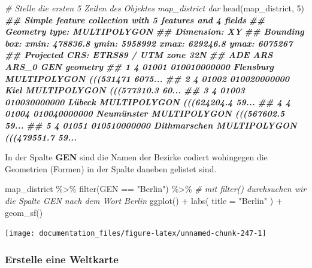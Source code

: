 \documentclass[
]{article}
\newenvironment{Shaded}{\begin{snugshade}}{\end{snugshade}}
\newcommand{\AttributeTok}[1]{\textcolor[rgb]{0.77,0.63,0.00}{#1}}
\newcommand{\CommentTok}[1]{\textcolor[rgb]{0.56,0.35,0.01}{\textit{#1}}}
\newcommand{\DecValTok}[1]{\textcolor[rgb]{0.00,0.00,0.81}{#1}}
\newcommand{\DocumentationTok}[1]{\textcolor[rgb]{0.56,0.35,0.01}{\textbf{\textit{#1}}}}
\newcommand{\FunctionTok}[1]{\textcolor[rgb]{0.00,0.00,0.00}{#1}}
\newcommand{\NormalTok}[1]{#1}
\newcommand{\SpecialCharTok}[1]{\textcolor[rgb]{0.00,0.00,0.00}{#1}}
\newcommand{\StringTok}[1]{\textcolor[rgb]{0.31,0.60,0.02}{#1}}
\begin{document}
\begin{Shaded}
\begin{Highlighting}[]

\CommentTok{\# Stelle die ersten 5 Zeilen des Objektes map\_district dar}
\FunctionTok{head}\NormalTok{(map\_district, }\DecValTok{5}\NormalTok{)}
\DocumentationTok{\#\# Simple feature collection with 5 features and 4 fields}
\DocumentationTok{\#\# Geometry type: MULTIPOLYGON}
\DocumentationTok{\#\# Dimension:     XY}
\DocumentationTok{\#\# Bounding box:  xmin: 478836.8 ymin: 5958992 xmax: 629246.8 ymax: 6075267}
\DocumentationTok{\#\# Projected CRS: ETRS89 / UTM zone 32N}
\DocumentationTok{\#\#   ADE   ARS        ARS\_0          GEN                       geometry}
\DocumentationTok{\#\# 1   4 01001 010010000000    Flensburg MULTIPOLYGON (((531471 6075...}
\DocumentationTok{\#\# 2   4 01002 010020000000         Kiel MULTIPOLYGON (((577310.3 60...}
\DocumentationTok{\#\# 3   4 01003 010030000000       Lübeck MULTIPOLYGON (((624204.4 59...}
\DocumentationTok{\#\# 4   4 01004 010040000000   Neumünster MULTIPOLYGON (((567602.5 59...}
\DocumentationTok{\#\# 5   4 01051 010510000000 Dithmarschen MULTIPOLYGON (((479551.7 59...}
\end{Highlighting}
\end{Shaded}

In der Spalte \textbf{GEN} sind die Namen der Bezirke codiert wohingegen die Geometrien (Formen) in der Spalte daneben gelistet sind.

\begin{Shaded}
\begin{Highlighting}[]

\NormalTok{map\_district }\SpecialCharTok{\%\textgreater{}\%}
  \FunctionTok{filter}\NormalTok{(GEN }\SpecialCharTok{==} \StringTok{"Berlin"}\NormalTok{) }\SpecialCharTok{\%\textgreater{}\%} \CommentTok{\# mit filter() durchsuchen wir die Spalte GEN nach dem Wort Berlin}
  \FunctionTok{ggplot}\NormalTok{() }\SpecialCharTok{+}
  \FunctionTok{labs}\NormalTok{(}
    \AttributeTok{title =} \StringTok{"Berlin"}
\NormalTok{  ) }\SpecialCharTok{+}
  \FunctionTok{geom\_sf}\NormalTok{()}
\end{Highlighting}
\end{Shaded}

\begin{center}\texttt{[image: documentation\_files/figure-latex/unnamed-chunk-247-1]} \end{center}

\hypertarget{erstelle-eine-weltkarte}{%
\subsubsection{Erstelle eine Weltkarte}\label{erstelle-eine-weltkarte}}
\end{document}

